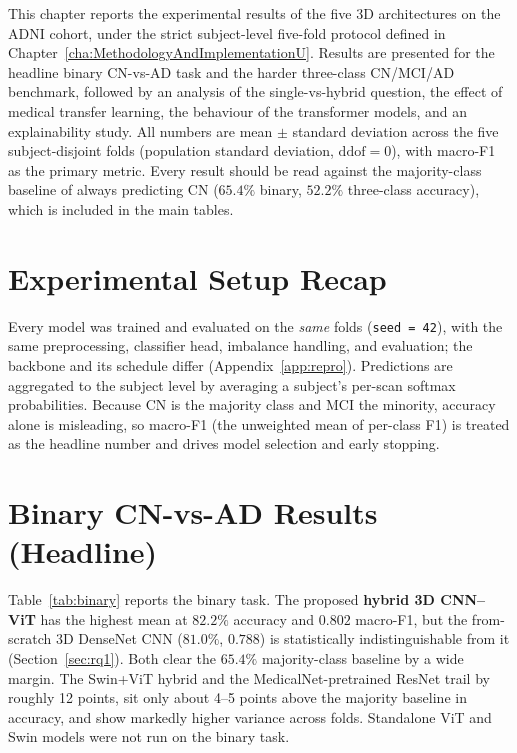 This chapter reports the experimental results of the five 3D architectures on the ADNI cohort, under the strict subject-level five-fold protocol defined in Chapter~\ref{cha:MethodologyAndImplementationU}. Results are presented for the headline binary CN-vs-AD task and the harder three-class CN/MCI/AD benchmark, followed by an analysis of the single-vs-hybrid question, the effect of medical transfer learning, the behaviour of the transformer models, and an explainability study. All numbers are mean $\pm$ standard deviation across the five subject-disjoint folds (population standard deviation, $\mathrm{ddof}=0$), with macro-F1 as the primary metric. Every result should be read against the majority-class baseline of always predicting CN ($65.4\%$ binary, $52.2\%$ three-class accuracy), which is included in the main tables.

\section{Experimental Setup Recap}
Every model was trained and evaluated on the \emph{same} folds (\texttt{seed = 42}), with the same preprocessing, classifier head, imbalance handling, and evaluation; the backbone and its schedule differ (Appendix~\ref{app:repro}). Predictions are aggregated to the subject level by averaging a subject's per-scan softmax probabilities. Because CN is the majority class and MCI the minority, accuracy alone is misleading, so macro-F1 (the unweighted mean of per-class F1) is treated as the headline number and drives model selection and early stopping.

\section{Binary CN-vs-AD Results (Headline)}
Table~\ref{tab:binary} reports the binary task. The proposed \textbf{hybrid 3D CNN--ViT} has the highest mean at $82.2\%$ accuracy and $0.802$ macro-F1, but the from-scratch 3D DenseNet CNN ($81.0\%$, $0.788$) is statistically indistinguishable from it (Section~\ref{sec:rq1}). Both clear the $65.4\%$ majority-class baseline by a wide margin. The Swin+ViT hybrid and the MedicalNet-pretrained ResNet trail by roughly 12 points, sit only about 4--5 points above the majority baseline in accuracy, and show markedly higher variance across folds. Standalone ViT and Swin models were not run on the binary task.

